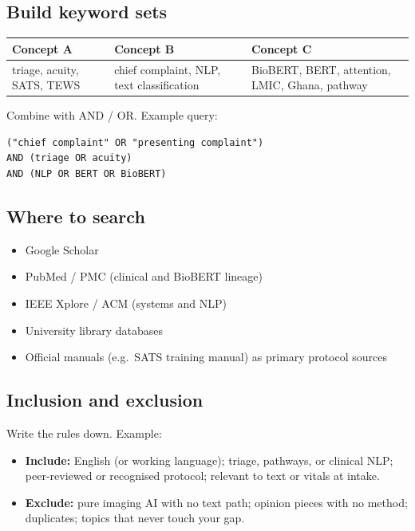\documentclass[11pt,a4paper]{article}
\begin{document}
\subsection{Build keyword sets}
\begin{center}
\begin{tabular}{@{}p{}p{}p{}@{}}
\toprule
\textbf{Concept A} & \textbf{Concept B} & \textbf{Concept C} \\
\midrule
triage, acuity, SATS, TEWS &
chief complaint, NLP, text classification &
BioBERT, BERT, attention, LMIC, Ghana, pathway \\
\bottomrule
\end{tabular}
\end{center}
Combine with AND / OR. Example query:
\begin{lstlisting}
("chief complaint" OR "presenting complaint")
AND (triage OR acuity)
AND (NLP OR BERT OR BioBERT)
\end{lstlisting}

\subsection{Where to search}
\begin{itemize}
  \item Google Scholar
  \item PubMed / PMC (clinical and BioBERT lineage)
  \item IEEE Xplore / ACM (systems and NLP)
  \item University library databases
  \item Official manuals (e.g.\ SATS training manual) as primary protocol sources
\end{itemize}

\subsection{Inclusion and exclusion}
Write the rules down. Example:
\begin{itemize}
  \item \textbf{Include:} English (or working language); triage, pathways, or clinical NLP; peer-reviewed or recognised protocol; relevant to text or vitals at intake.
  \item \textbf{Exclude:} pure imaging AI with no text path; opinion pieces with no method; duplicates; topics that never touch your gap.
\end{itemize}
\end{document}
